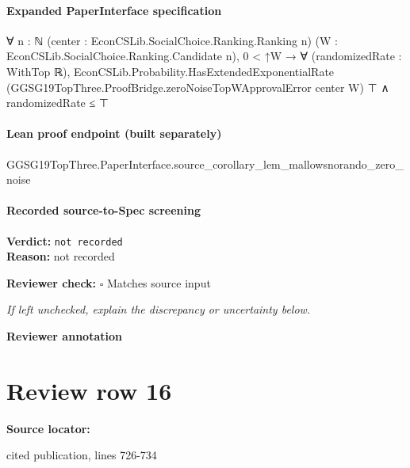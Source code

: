 \documentclass[10pt]{article}
\newcommand{\reviewerbox}{%
  \par\noindent\fbox{\parbox{0.96\linewidth}{\rule{0pt}{0.38in}}}\par
}
\newcommand{\reviewmatch}[1]{%
  \par\noindent\textbf{Reviewer check:} $\square$\; #1\par
  \noindent\emph{If left unchecked, explain the discrepancy or uncertainty below.}\par
}
\begin{document}
\paragraph{Expanded PaperInterface specification}
\begin{ReviewVerbatim}
∀ {n : ℕ} (center : EconCSLib.SocialChoice.Ranking.Ranking n) (W : EconCSLib.SocialChoice.Ranking.Candidate n),
  0 < ↑W →
    ∀ (randomizedRate : WithTop ℝ),
      EconCSLib.Probability.HasExtendedExponentialRate (GGSG19TopThree.ProofBridge.zeroNoiseTopWApprovalError center W)
          ⊤ ∧
        randomizedRate ≤ ⊤
\end{ReviewVerbatim}

\paragraph{Lean proof endpoint (built separately)}\begin{ReviewVerbatim}
GGSG19TopThree.PaperInterface.source_corollary_lem_mallowsnorando_zero_noise
\end{ReviewVerbatim}

\paragraph{Recorded source-to-Spec screening}
\textbf{Verdict:} \texttt{not recorded}
\\
\textbf{Reason:} not recorded
\reviewmatch{Matches source input}
\noindent\textbf{Reviewer annotation}\par
\reviewerbox
\clearpage
\hypertarget{source-claim-57ef0e97610a7efd}{}
\section*{Review row 16}
\textbf{Source locator:} {\footnotesize\raggedright cited publication, lines 726-\allowbreak{}734\par}
\end{document}
